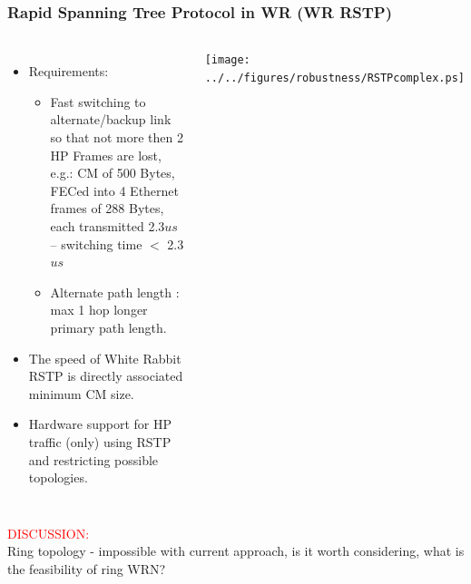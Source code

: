 \documentclass[]{beamer}
\begin{document}
\begin{frame}
  \frametitle{Rapid Spanning Tree Protocol in WR (WR RSTP)}
  
  \begin{columns}[c]
  \column{3.8in} 

  \begin{itemize}
  \item Requirements:
  \begin{itemize}
    \item Fast switching to alternate/backup link so that not more then 2 HP
          Frames are lost, e.g.: CM of 500 Bytes, FECed into 4 Ethernet frames
          of 288 Bytes, each transmitted 2.3$us$ -- switching time $<$ 2.3$us$
    \item Alternate path length : max 1 hop longer primary path length.
  \end{itemize}
  \item The speed of White Rabbit RSTP is directly associated minimum CM size.
  \item Hardware support for HP traffic (only) using RSTP and restricting
        possible topologies.
  \end{itemize}

  \column{1.2in}

  \centering
  \texttt{[image: ../../figures/robustness/RSTPcomplex.ps]}

  \end{columns}
\centering
\textcolor{red}{DISCUSSION:} \\
Ring topology - impossible with current approach, is it worth considering, what
is the feasibility of ring WRN?

\end{frame}
\end{document}
